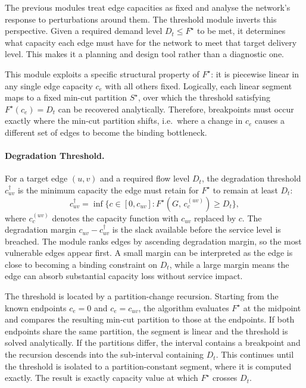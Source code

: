 \documentclass[12pt]{report}
\begin{document}
The previous modules treat edge capacities as fixed and analyse the network's response to perturbations around them. The threshold module inverts this perspective. Given a required demand level $D_t \leq F^\star$ to be met, it determines what capacity each edge must have for the network to meet that  target delivery level. This makes it a planning and design tool rather than a diagnostic one. 

This module exploits a specific structural property of $F^\star$: it is piecewise linear in any single edge capacity $c_e$ with all others fixed. Logically, each linear segment maps to a fixed min-cut partition $S^\star$, over which the threshold satisfying $F^\star(c_e) = D_t$ can be recovered analytically. Therefore, breakpoints must occur exactly where the min-cut partition shifts, i.e.\ where a change in $c_e$ causes a different set of edges to become the binding bottleneck.

\paragraph{Degradation Threshold.}
For a target edge $(u,v)$ and a required flow level $D_t$, the degradation threshold $c^\dagger_{uv}$ is the minimum capacity the edge must retain for $F^\star$ to remain at least $D_t$:
\[
c^\dagger_{uv} = \inf\bigl\{c \in [0, c_{uv}] : 
F^\star(G,\, c^{(uv)}_c) \geq D_t \bigr\},
\]
where $c^{(uv)}_c$ denotes the capacity function with $c_{uv}$ replaced by $c$. The degradation margin $c_{uv} - c^\dagger_{uv}$ is the slack available before the service level is breached. The module ranks edges by ascending degradation margin, so the most vulnerable edges appear first. A small margin can be interpreted as the edge is close to becoming a binding constraint on $D_t$, while a large margin means the edge can absorb substantial capacity loss without service impact.

The threshold is located by a partition-change recursion. Starting from the known endpoints $c_e = 0$ and $c_e = c_{uv}$, the algorithm evaluates $F^\star$ at the midpoint and compares the resulting min-cut partition to those at the endpoints. If both endpoints share the same partition, the segment is linear and the threshold is solved analytically. If the partitions differ, the interval contains a breakpoint and the recursion descends into the sub-interval containing $D_t$. This continues until the threshold is isolated to a partition-constant segment, where it is computed exactly. The result is exactly capacity value at which $F^\star$ crosses $D_t$.
\end{document}
